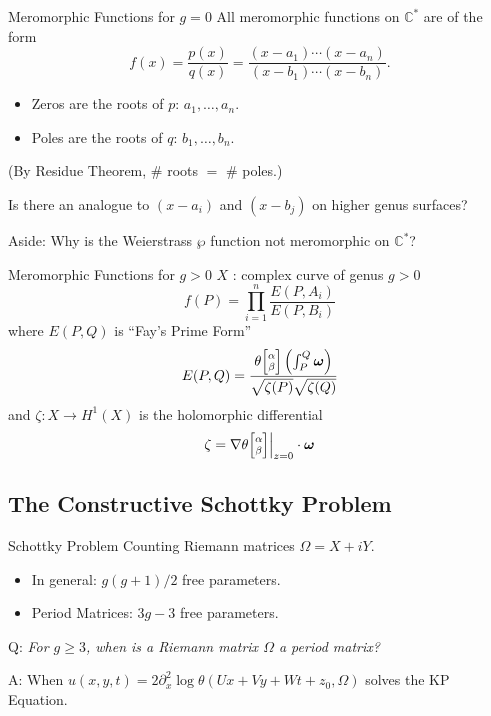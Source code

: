 \documentclass {beamer}
\newcommand{\thetachar}[2] {\theta {\scriptsize \begin{bmatrix}#1\\#2\end{bmatrix}}}
\begin{document}
\begin{frame}{Meromorphic Functions for $g=0$}{}
  All meromorphic functions on $\mathbb{C}^*$ are of the form
  \[
  f(x) = \frac{p(x)}{q(x)} =
  \frac{(x-a_1) \cdots (x-a_n)}{(x-b_1) \cdots (x-b_n)}.
  \]
  \begin{itemize}
    \item Zeros are the roots of $p$: $a_1, \ldots, a_n$.
    \item Poles are the roots of $q$: $b_1, \ldots, b_n$.
  \end{itemize}
  (By Residue Theorem, \#\!\! roots $=$ \#\!\! poles.)

  \vspace{16pt}

  Is there an analogue to $(x-a_i)$ and $(x-b_j)$ on higher genus
  surfaces?

  \vspace{16pt}

  \begin{block}
  {\footnotesize Aside: Why is the Weierstrass $\wp$ function not
    meromorphic on $\mathbb{C}^*$?}
  \end{block}
\end{frame}

\begin{frame}{Meromorphic Functions for $g>0$}{}
  $X$ : complex curve of genus $g > 0$
  \[
      f(P) = \prod_{i=1}^n \frac{E(P,A_i)}{E(P,B_i)}
  \]
  where $E(P,Q)$ is ``Fay's Prime Form''
  \[
      E(P,Q) = \frac{
        \thetachar{\alpha}{\beta}
        \left(
        \int_P^Q \boldsymbol{\omega}
        \right)
        }
      {
        \sqrt{\zeta(P)} \sqrt{\zeta(Q)}
      }
  \]
  and $\zeta : X \to H^1(X)$ is the holomorphic differential
  \[
      \zeta = \nabla \thetachar{\alpha}{\beta} \Big|_{z=0} \cdot
      \boldsymbol{\omega}
  \]
\end{frame}

\subsection{The Constructive Schottky Problem}

\begin{frame}{Schottky Problem}{}
  Counting Riemann matrices $\Omega = X + iY$.
  \begin{itemize}
    \item In general: $g(g+1)/2$ free parameters.
    \item Period Matrices: $3g-3$ free parameters.
  \end{itemize}

  \begin{block}
    {Q: \it For $g \geq 3$, when is a Riemann matrix $\Omega$ a period
      matrix?}
  \end{block}
  A: When $u(x,y,t) = 2 \partial^2_x \log \theta(Ux + Vy + Wt +
  z_0,\Omega)$ solves the KP Equation.
\end{frame}


\begin{frame}
\end{frame}
\end{document}
